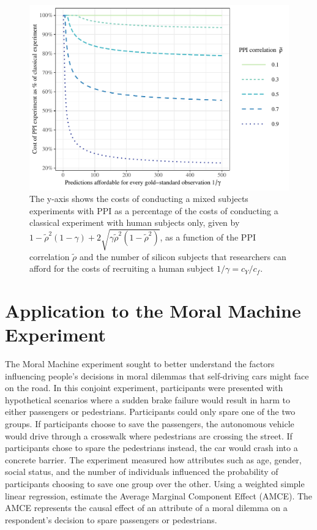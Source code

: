 \documentclass{article}
\begin{document}
\clearpage

\begin{figure}[p]
    \centering
    \includegraphics[width=0.8\linewidth]{3_PercentCostOfHumanSubjectsExperiment.pdf}
    \caption{The y-axis shows the costs of conducting a mixed subjects experiments with PPI as a percentage of the costs of conducting a classical experiment with human subjects only, given by $1 - \tilde{\rho}^2(1 - \gamma) + 2 \sqrt{\gamma \tilde{\rho}^2(1-\tilde{\rho}^2)}$, as a function of the PPI correlation $\tilde{\rho}$ and the number of silicon subjects that researchers can afford for the costs of recruiting a human subject $1/\gamma = c_Y/c_f.$}
    \label{fig:perc-cost-reduction}
\end{figure}

\clearpage


\section{Application to the Moral Machine Experiment}

The Moral Machine experiment \citep{awad_moral_2018} sought to better understand the factors influencing people's decisions in moral dilemmas that self-driving cars might face on the road. In this conjoint experiment, participants were presented with hypothetical scenarios where a sudden brake failure would result in harm to either passengers or pedestrians. Participants could only spare one of the two groups. If participants choose to save the passengers, the autonomous vehicle would drive through a crosswalk where pedestrians are crossing the street. If participants chose to spare the pedestrians instead, the car would crash into a concrete barrier. The experiment measured how attributes such as age, gender, social status, and the number of individuals influenced the probability of participants choosing to save one group over the other. Using a weighted simple linear regression, \citet{awad_moral_2018} estimate the Average Marginal Component Effect (AMCE). The AMCE represents the causal effect of an attribute of a moral dilemma on a respondent's decision to spare passengers or pedestrians.
 
\end{document}
